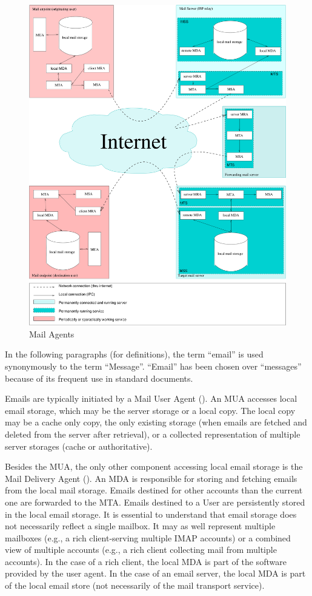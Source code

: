 \begin{figure}[ht!]
	\centering\includegraphics[width=\columnwidth]{inc/MailAgents1.pdf}
	\caption{Mail Agents}\label{fig:MailAgents}
\end{figure}

In the following paragraphs (for definitions), the term ``email'' is used synonymously to the term ``Message''.  ``Email'' has been chosen over ``messages'' because of its frequent use in standard documents.

Emails are typically initiated by a Mail User Agent (). An MUA accesses local email storage, which may be the server storage or a local copy. The local copy may be a cache only copy, the only existing storage (when emails are fetched and deleted from the server after retrieval), or a collected representation of multiple server storages (cache or authoritative).

Besides the MUA, the only other component accessing local email storage is the Mail Delivery Agent (). An MDA is responsible for storing and fetching emails from the local mail storage. Emails destined for other accounts than the current one are forwarded to the MTA. Emails destined to a User are persistently stored in the local email storage. It is essential to understand that email storage does not necessarily reflect a single mailbox. It may as well represent multiple mailboxes (e.g., a rich client-serving multiple IMAP accounts) or a combined view of multiple accounts (e.g., a rich client collecting mail from multiple  accounts). In the case of a rich client, the local MDA is part of the software provided by the user agent. In the case of an email server, the local MDA is part of the local email store (not necessarily of the mail transport service).

